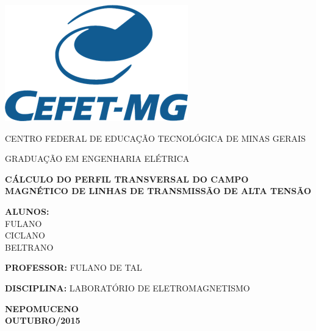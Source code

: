 \documentclass[12pt,a4paper]{article}
\begin{document}

\thispagestyle{empty}

\begin{center}

\includegraphics[scale=0.5]{figuras/logo_cefet.png}

\vspace{0.5in}

CENTRO FEDERAL DE EDUCAÇÃO TECNOLÓGICA DE MINAS GERAIS

\vspace{0.5in}

GRADUAÇÃO EM ENGENHARIA ELÉTRICA

\vspace{1.0in}

{\Large \textbf{CÁLCULO DO PERFIL TRANSVERSAL DO CAMPO MAGNÉTICO DE LINHAS DE TRANSMISSÃO DE ALTA TENSÃO}}

\end{center}

\vspace{1.8in}

\begin{flushleft}
\textbf{ALUNOS:} \\
FULANO\\
CICLANO\\
BELTRANO

\textbf{PROFESSOR:} FULANO DE TAL

\textbf{DISCIPLINA: } LABORATÓRIO DE ELETROMAGNETISMO
\end{flushleft}

\vspace{0.8in}

\begin{center}
\textbf{NEPOMUCENO}\\
\textbf{OUTUBRO/2015} %

\end{center}
\end{document}
